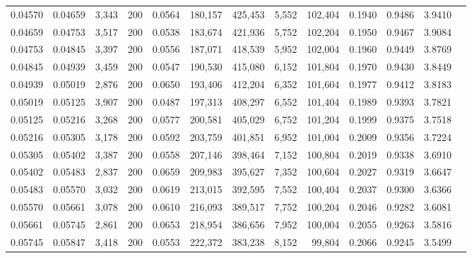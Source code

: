 \begin{tabular}{rrrrrrrrrrrrr}
0.04570 & 0.04659 &  3,343 & 200 &                                     0.0564 & 180,157 & 425,453 &   5,552 & 102,404 & 0.1940 & 0.9486 & 3.9410 \\
0.04659 & 0.04753 &  3,517 & 200 &                                     0.0538 & 183,674 & 421,936 &   5,752 & 102,204 & 0.1950 & 0.9467 & 3.9084 \\
0.04753 & 0.04845 &  3,397 & 200 &                                     0.0556 & 187,071 & 418,539 &   5,952 & 102,004 & 0.1960 & 0.9449 & 3.8769 \\
0.04845 & 0.04939 &  3,459 & 200 &                                     0.0547 & 190,530 & 415,080 &   6,152 & 101,804 & 0.1970 & 0.9430 & 3.8449 \\
0.04939 & 0.05019 &  2,876 & 200 &                                     0.0650 & 193,406 & 412,204 &   6,352 & 101,604 & 0.1977 & 0.9412 & 3.8183 \\
0.05019 & 0.05125 &  3,907 & 200 &                                     0.0487 & 197,313 & 408,297 &   6,552 & 101,404 & 0.1989 & 0.9393 & 3.7821 \\
0.05125 & 0.05216 &  3,268 & 200 &                                     0.0577 & 200,581 & 405,029 &   6,752 & 101,204 & 0.1999 & 0.9375 & 3.7518 \\
0.05216 & 0.05305 &  3,178 & 200 &                                     0.0592 & 203,759 & 401,851 &   6,952 & 101,004 & 0.2009 & 0.9356 & 3.7224 \\
0.05305 & 0.05402 &  3,387 & 200 &                                     0.0558 & 207,146 & 398,464 &   7,152 & 100,804 & 0.2019 & 0.9338 & 3.6910 \\
0.05402 & 0.05483 &  2,837 & 200 &                                     0.0659 & 209,983 & 395,627 &   7,352 & 100,604 & 0.2027 & 0.9319 & 3.6647 \\
0.05483 & 0.05570 &  3,032 & 200 &                                     0.0619 & 213,015 & 392,595 &   7,552 & 100,404 & 0.2037 & 0.9300 & 3.6366 \\
0.05570 & 0.05661 &  3,078 & 200 &                                     0.0610 & 216,093 & 389,517 &   7,752 & 100,204 & 0.2046 & 0.9282 & 3.6081 \\
0.05661 & 0.05745 &  2,861 & 200 &                                     0.0653 & 218,954 & 386,656 &   7,952 & 100,004 & 0.2055 & 0.9263 & 3.5816 \\
0.05745 & 0.05847 &  3,418 & 200 &                                     0.0553 & 222,372 & 383,238 &   8,152 &  99,804 & 0.2066 & 0.9245 & 3.5499 \\

\end{tabular}
